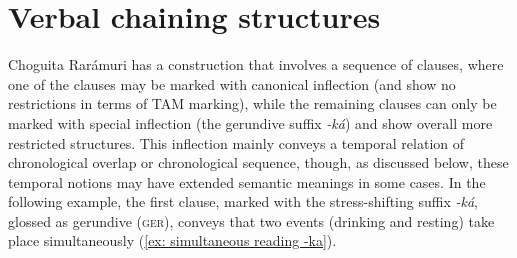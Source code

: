     \z
\z



\section{Verbal chaining structures}
\label{sec: clause chaining}

Choguita Rarámuri has a construction that involves a sequence of clauses, where one of the clauses may be marked with canonical inflection (and show no restrictions in terms of TAM marking), while the remaining clauses can only be marked with special inflection (the gerundive suffix \textit{-ká}) and show overall more restricted structures. This inflection mainly conveys a temporal relation of chronological overlap or chronological sequence, though, as discussed below, these temporal notions may have extended semantic meanings in some cases. In the following example, the first clause, marked with the stress-shifting suffix \textit{-ká}, glossed as gerundive (\textsc{ger}), conveys that two events (drinking and resting) take place simultaneously (\ref{ex: simultaneous reading -ka}).


\ea\label{ex: simultaneous reading -ka}

